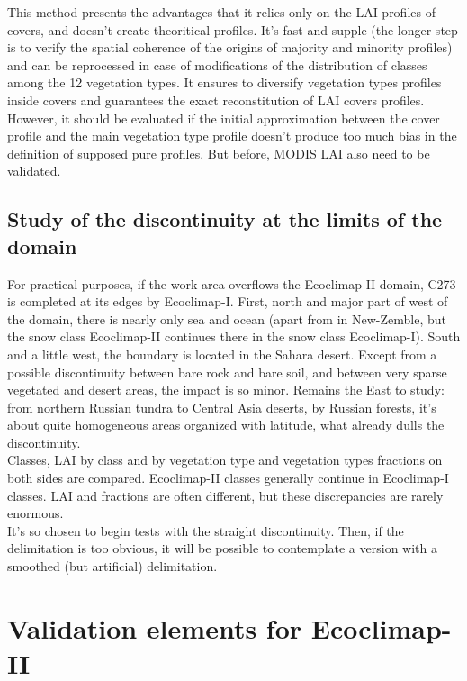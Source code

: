 This method presents the advantages that it relies only on the LAI profiles of covers, and doesn't create theoritical profiles. It's fast and 
supple (the longer step is to verify the spatial coherence of the origins of majority and minority profiles) and can be reprocessed 
in case of modifications of the distribution of classes among the 12 vegetation types. It ensures to diversify vegetation types profiles 
inside covers and guarantees the exact reconstitution of LAI covers profiles. However, it should be evaluated if the initial approximation 
between the cover profile and the main vegetation type profile doesn't produce too much bias in the definition of supposed pure profiles. 
But before, MODIS LAI also need to be validated.

\section{Study of the discontinuity at the limits of the domain}

For practical purposes, if the work area overflows the Ecoclimap-II domain, C273 is completed at its edges by Ecoclimap-I. First, north and major part 
of west of the 
domain, there is nearly only sea and ocean (apart from in New-Zemble, but the snow class Ecoclimap-II continues there in the snow class 
Ecoclimap-I). South and a little west, the boundary is located in the Sahara desert. Except from a possible discontinuity between bare rock and bare soil, 
and between very sparse vegetated and desert areas, 
the impact is so minor. Remains the East to study: from northern Russian tundra to Central Asia deserts, by Russian forests, it's 
about quite homogeneous areas organized with latitude, what already dulls the discontinuity.\\
Classes, LAI by class and by vegetation type and vegetation types fractions on both sides are compared. Ecoclimap-II 
classes generally continue in Ecoclimap-I classes. LAI and fractions are often different, but these discrepancies are rarely 
enormous. \\
It's so chosen to begin tests with the straight discontinuity. Then, if the delimitation is too obvious, 
it will be possible to contemplate a version with a smoothed (but artificial) delimitation. 

\chapter{Validation elements for Ecoclimap-II}

